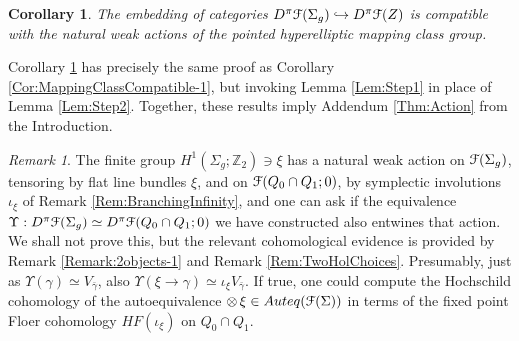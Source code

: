 \documentclass[reqno,10pt]{amsart}
\numberwithin{equation}{section}
\newcommand{\bZ}{{\mathbb Z}}
\newcommand{\scrF}{\EuScript{F}}
\newtheorem{Corollary}[thm]{Corollary}
\theoremstyle{remark}
\newtheorem{Remark}[thm]{Remark}
\begin{document}
\begin{Corollary} \label{Cor:Compatible}
The embedding of categories $D^{\pi}\scrF(\Sigma_g) \hookrightarrow D^{\pi}\scrF(Z)$ is compatible with the natural weak actions of the pointed hyperelliptic mapping class group.  \end{Corollary}

Corollary \ref{Cor:Compatible} has precisely the same proof as Corollary \ref{Cor:MappingClassCompatible-1}, but invoking Lemma \ref{Lem:Step1} in place of Lemma \ref{Lem:Step2}.   Together, these results imply Addendum \ref{Thm:Action} from the Introduction.

\begin{Remark} \label{Remark:FiniteGroupEntwine}
The finite group $H^1(\Sigma_g;\bZ_2)\ni \xi$ has a natural weak action on $\scrF(\Sigma_g)$, tensoring by flat line bundles $\xi$, and on $\scrF(Q_0 \cap Q_1;0)$, by symplectic involutions $\iota_{\xi}$ of Remark \ref{Rem:BranchingInfinity}, and one can ask if the equivalence $\Upsilon: D^{\pi}\scrF(\Sigma_g) \simeq D^{\pi}\scrF(Q_0 \cap Q_1;0)$ we have constructed also entwines that action. We shall not prove this, but the relevant cohomological evidence is provided by Remark \ref{Remark:2objects-1} and Remark \ref{Rem:TwoHolChoices}.  Presumably, just as $\Upsilon(\gamma) \simeq V_{\bar\gamma}$, also $\Upsilon(\xi \rightarrow \gamma) \simeq \iota_{\xi} V_{\bar\gamma}$.  If true, one could compute the Hochschild cohomology of the autoequivalence $\otimes \,\xi \in Auteq(\scrF(\Sigma))$ in terms of the fixed point Floer cohomology $HF(\iota_{\xi})$ on $Q_0 \cap Q_1$.
\end{Remark}
\end{document}
